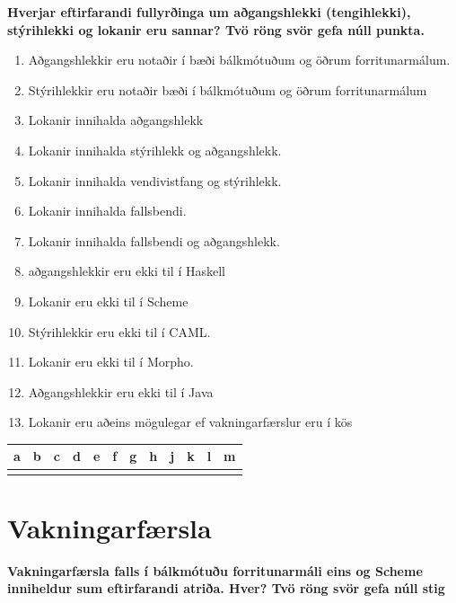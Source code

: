 \documentclass{article}
\newcommand{\bo}[1]{\textbf{#1}}
\newcommand{\enum}{\begin{enumerate}[label = \alph*.]}
\begin{document}
\newpage

\bo{Hverjar eftirfarandi fullyrðinga um aðgangshlekki (tengihlekki),
stýrihlekki og lokanir eru sannar? Tvö röng svör gefa núll punkta.}

\enum
\item Aðgangshlekkir eru notaðir í bæði bálkmótuðum og öðrum
forritunarmálum.
\item Stýrihlekkir eru notaðir bæði í bálkmótuðum og öðrum
forritunarmálum
\item Lokanir innihalda aðgangshlekk
\item Lokanir innihalda stýrihlekk og aðgangshlekk.
\item Lokanir innihalda vendivistfang og stýrihlekk.
\item Lokanir innihalda fallsbendi.
\item Lokanir innihalda fallsbendi og aðgangshlekk.
\item aðgangshlekkir eru ekki til í Haskell
\item Lokanir eru ekki til í Scheme
\item Stýrihlekkir eru ekki til í CAML.
\item Lokanir eru ekki til í Morpho.
\item Aðgangshlekkir eru ekki til í Java
\item Lokanir eru aðeins mögulegar ef vakningarfærslur eru í kös
\end{enumerate}

\begin{tabularx}{\textwidth}{|X|X|X|X|X|X|X|X|X|X|X|X|}
    \hline
    \bo{a} & \bo{b} & \bo{c} & \bo{d} & \bo{e} & \bo{f} & \bo{g} & \bo{h} & \bo{j} & \bo{k} & \bo{l} & \bo{m}  \\ \hline
     & & & & & & & & & & &  \\ \hline
\end{tabularx}


\newpage
\section{Vakningarfærsla}

\bo{Vakningarfærsla falls í bálkmótuðu forritunarmáli eins og Scheme
inniheldur sum eftirfarandi atriða. Hver? Tvö röng svör gefa núll
stig}
\end{document}
